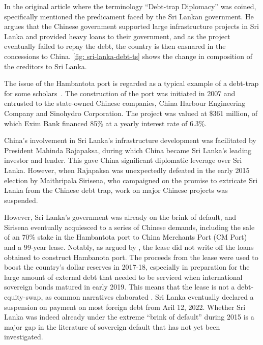 In the original article where the terminology ``Debt-trap Diplomacy'' was coined, \citet{Chellaney_2017} specifically mentioned the predicament faced by the Sri Lankan government. He argues that the Chinese government supported large infrastructure projects in Sri Lanka and provided heavy loans to their government, and as the project eventually failed to repay the debt, the country is then ensnared in the concessions to China. \autoref{fig: sri-lanka-debt-ts} shows the change in composition of the creditors to Sri Lanka.

The issue of the Hambantota port is regarded as a typical example of a debt-trap for some scholars~\citep*{Moramudali_2020}.
The construction of the port was initiated in 2007 and entrusted to the state-owned Chinese companies, China Harbour Engineering Company and Sinohydro Corporation. The project was valued at \$361 million, of which Exim Bank financed 85\% at a yearly interest rate of 6.3\%.

China's involvement in Sri Lanka's infrastructure development was facilitated by President Mahinda Rajapaksa, during which China became Sri Lanka's leading investor and lender. This gave China significant diplomatic leverage over Sri Lanka. 
However, when Rajapaksa was unexpectedly defeated in the early 2015 election by Maithripala Sirisena, who campaigned on the promise to extricate Sri Lanka from the Chinese debt trap, work on major Chinese projects was suspended.

However, Sri Lanka's government was already on the brink of default, and Sirisena eventually acquiesced to a series of Chinese demands\footnotemark{}, including the sale of an 70\% stake in the Hambantota port to China Merchants Port (CM Port) and a 99-year lease.
Notably, as argued by \citet*{Moramudali_2019}, the lease did not write off the loans obtained to construct Hambanota port. The proceeds from the lease were used to boost the country's dollar reserves in 2017-18, especially in preparation for the large amount of external debt that needed to be serviced when international sovereign bonds matured in early 2019. This means that the lease is not a debt-equity-swap, as common narratives elaborated \citep*{Moramudali_2020}.
Sri Lanka eventually declared a suspension on payment on most foreign debt from Aril 12, 2022. Whether Sri Lanka was indeed already under the extreme ``brink of default'' during 2015 is a major gap in the literature of sovereign default that has not yet been investigated.

